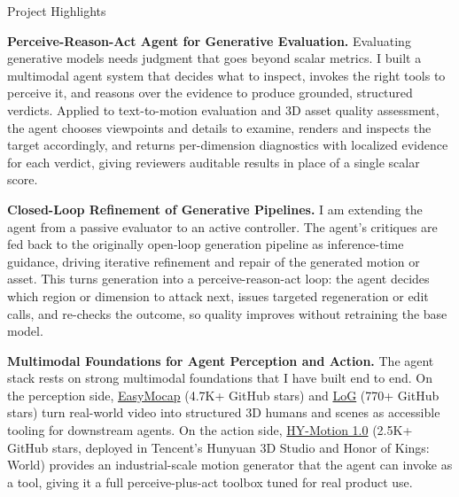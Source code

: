 \begin{rSection}{Project Highlights}

    {\bf Perceive-Reason-Act Agent for Generative Evaluation.} Evaluating generative models needs judgment that goes beyond scalar metrics. I built a multimodal agent system that decides what to inspect, invokes the right tools to perceive it, and reasons over the evidence to produce grounded, structured verdicts. Applied to text-to-motion evaluation and 3D asset quality assessment, the agent chooses viewpoints and details to examine, renders and inspects the target accordingly, and returns per-dimension diagnostics with localized evidence for each verdict, giving reviewers auditable results in place of a single scalar score.

    {\bf Closed-Loop Refinement of Generative Pipelines.} I am extending the agent from a passive evaluator to an active controller. The agent's critiques are fed back to the originally open-loop generation pipeline as inference-time guidance, driving iterative refinement and repair of the generated motion or asset. This turns generation into a perceive-reason-act loop: the agent decides which region or dimension to attack next, issues targeted regeneration or edit calls, and re-checks the outcome, so quality improves without retraining the base model.

    {\bf Multimodal Foundations for Agent Perception and Action.} The agent stack rests on strong multimodal foundations that I have built end to end. On the perception side, \href{https://github.com/zju3dv/EasyMocap}{EasyMocap} (4.7K+ GitHub stars) and \href{https://github.com/zju3dv/LoG}{LoG} (770+ GitHub stars) turn real-world video into structured 3D humans and scenes as accessible tooling for downstream agents. On the action side, \href{https://github.com/Tencent-Hunyuan/HY-Motion-1.0}{HY-Motion 1.0} (2.5K+ GitHub stars, deployed in Tencent's Hunyuan 3D Studio and Honor of Kings: World) provides an industrial-scale motion generator that the agent can invoke as a tool, giving it a full perceive-plus-act toolbox tuned for real product use.

\end{rSection}
